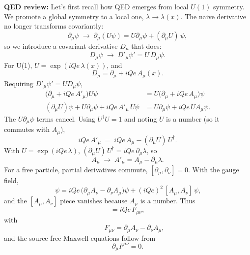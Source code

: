 \documentclass[12pt]{article}
\begin{document}
\noindent
{\bf QED review:}
Let's first recall how QED emerges from local $U(1)$ symmetry.  We
promote a global symmetry to a local one, $\lambda \to
\lambda(x)$. The naive derivative no longer transforms covariantly:
\begin{equation*}
    \partial_\mu \psi \;\longrightarrow\; \partial_\mu (U\psi)
       = U \partial_\mu \psi + (\partial_\mu U)\,\psi,
\end{equation*}
so we introduce a covariant derivative $D_\mu$ that does:
\begin{equation*}
    D_\mu \psi \;\longrightarrow\; D'_\mu \psi' = U\, D_\mu \psi.
\end{equation*}
For U(1), $U = \exp(iQ e\, \lambda(x))$, and
\begin{equation*}
  D_\mu = \partial_\mu + i Q e\, A_\mu(x).
\end{equation*}
Requiring $D'_\mu \psi' = U D_\mu \psi$,
\begin{align*}
    \big(\partial_\mu + i Q e\, A'_\mu\big) U \psi
       &= U \big(\partial_\mu + i Q e\, A_\mu\big)\psi \\
    (\partial_\mu U)\psi + U \partial_\mu \psi + i Q e\, A'_\mu\, U \psi
       &= U \partial_\mu \psi + i Q e\, U A_\mu \psi.
\end{align*}
The $U \partial_\mu \psi$ terms cancel. Using $U^\dagger U = 1$ and noting $U$ is
a number (so it commutes with $A_\mu$),
\begin{equation*}
    i Q e\, A'_\mu \;=\; i Q e\, A_\mu - (\partial_\mu U)\, U^\dagger.
\end{equation*}
With $U = \exp(iQ e\, \lambda)$, $(\partial_\mu U)\, U^\dagger = i Q e\, \partial_\mu \lambda$, so
\begin{equation*}
    A_\mu \;\longrightarrow\; A'_\mu = A_\mu - \partial_\mu \lambda.
\end{equation*}
For a free particle, partial derivatives commute,
$[\partial_\mu, \partial_\nu] = 0$. With the gauge field,
\begin{equation*}
    [D_\mu, D_\nu]\, \psi
       = i Q e\,\big(\partial_\mu A_\nu - \partial_\nu A_\mu\big)\psi
         + (i Q e)^2\, [A_\mu, A_\nu]\,\psi,
\end{equation*}
and the $[A_\mu, A_\nu]$ piece vanishes because $A_\mu$ is a number. Thus
\begin{equation*}
    [D_\mu, D_\nu] = i Q e\, F_{\mu\nu},
\end{equation*}
with
\begin{equation}
    \qquad
    F_{\mu\nu} = \partial_\mu A_\nu - \partial_\nu A_\mu,
\end{equation}
and the source-free Maxwell equations follow from
\begin{equation}
  \partial_\mu F^{\mu\nu} = 0.
\end{equation}
\end{document}
